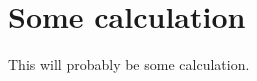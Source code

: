 \documentclass[main.tex]{subfiles}
\begin{document}
\section{Some calculation}
This will probably be some calculation.
\end{document}
